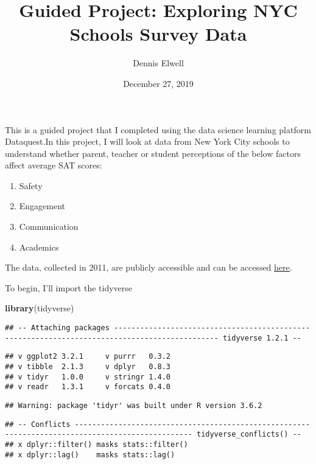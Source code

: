 \documentclass[]{article}
\title{Guided Project: Exploring NYC Schools Survey Data}
\author{Dennis Elwell}
\date{December 27, 2019}
\newenvironment{Shaded}{\begin{snugshade}}{\end{snugshade}}
\newcommand{\KeywordTok}[1]{\textcolor[rgb]{0.13,0.29,0.53}{\textbf{#1}}}
\newcommand{\NormalTok}[1]{#1}
\providecommand{\tightlist}{%
  \setlength{\itemsep}{0pt}\setlength{\parskip}{0pt}}
\begin{document}
\maketitle

This is a guided project that I completed using the data science
learning platform Dataquest.In this project, I will look at data from
New York City schools to understand whether parent, teacher or student
perceptions of the below factors affect average SAT scores:

\begin{enumerate}
\def\labelenumi{\arabic{enumi}.}
\tightlist
\item
  Safety
\item
  Engagement
\item
  Communication
\item
  Academics
\end{enumerate}

The data, collected in 2011, are publicly accessible and can be accessed
\href{https://data.cityofnewyork.us/Education/2011-NYC-School-Survey/mnz3-dyi8}{here}.

To begin, I'll import the tidyverse

\begin{Shaded}
\begin{Highlighting}[]
\KeywordTok{library}\NormalTok{(tidyverse)}
\end{Highlighting}
\end{Shaded}

\begin{verbatim}
## -- Attaching packages ---------------------------------------------------------------------------------------------- tidyverse 1.2.1 --
\end{verbatim}

\begin{verbatim}
## v ggplot2 3.2.1     v purrr   0.3.2
## v tibble  2.1.3     v dplyr   0.8.3
## v tidyr   1.0.0     v stringr 1.4.0
## v readr   1.3.1     v forcats 0.4.0
\end{verbatim}

\begin{verbatim}
## Warning: package 'tidyr' was built under R version 3.6.2
\end{verbatim}

\begin{verbatim}
## -- Conflicts ------------------------------------------------------------------------------------------------- tidyverse_conflicts() --
## x dplyr::filter() masks stats::filter()
## x dplyr::lag()    masks stats::lag()
\end{verbatim}
\end{document}
